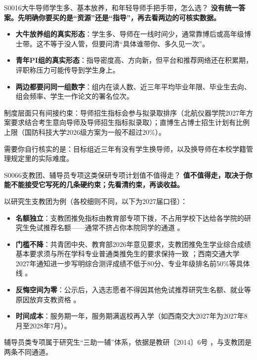 \begin{qa}{S0016}{大牛导师学生多、基本放养，和年轻导师手把手带，怎么选？}
\textbf{没有统一答案。先明确你要买的是“资源”还是“指导”，再去看两边的可核实数据。}

\begin{itemize}
  \item \textbf{大牛放养组的真实形态}：学生多、导师在一线时间少，通常靠博后或高年级博士带。这不等于没人管，但要问清“具体谁带你、多久见一次”。
  \item \textbf{青年PI组的真实形态}：指导密度高、方向新，但平台和推荐网络还在积累期，评职称压力可能传导到学生身上。
  \item \textbf{两边都要问同一组数字}：组内在读人数、近三年平均毕业年限、毕业生去向、组会频率、学生一作论文的署名位次。
\end{itemize}

制度层面只有间接约束：导师招生指标会参与拟录取排序（北航仪器学院2027年方案要求结合考生意向导师及导师招生指标拟录取）；直博生占博士招生计划有比例上限（国防科技大学2026级方案为一般不超过20\%）。

需要你自行核实的是：目标组近三年有没有学生换导师，以及换导师在本校学籍管理规定里的实际难度。
\end{qa}

\begin{qa}{S0066}{支教团、辅导员专项这类保研专项计划值不值得走？}
\textbf{值不值得走，取决于你能不能接受它写死的几条硬约束；先看清约束，再谈收益。}

以研究生支教团为例（各校细则不同，以下为2027届口径）：

\begin{itemize}
  \item \textbf{名额独立}：支教团推免指标由教育部专项下拨，不占用学校下达给各学院的研究生免试推荐名额——通常不挤占你本院同学的通道 。
  \item \textbf{门槛不降}：共青团中央、教育部2026年意见要求，支教团推免生学业综合成绩基本要求须与所在学科专业普通类推免生的要求保持一致 ；西南交通大学2027年通知进一步写明综合测评成绩不低于80分、专业年级排名前50\%等具体线 。
  \item \textbf{反悔空间为零}：公示后，入选志愿者不得因其他免试推荐研究生名额、就业等原因放弃支教资格 。
  \item \textbf{时间成本}：服务期一年，服务期满返校再入学（如西南交大2027年为2027年8月至2028年7月）。
\end{itemize}

辅导员类专项属于研究生“三助一辅”体系，依据是教研〔2014〕6号 ，与支教团是两条不同通道。
\end{qa}

